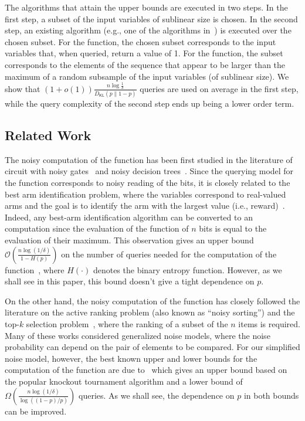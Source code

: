 \documentclass[journal, onecolumn]{IEEEtran}
\theoremstyle{plain}
\theoremstyle{definition}
\theoremstyle{remark}
\def\co{{\mathcal O}}
\begin{document}
The algorithms that attain the upper bounds are executed in two steps. In the first step, a subset of the input variables of sublinear size is chosen. In the second step, an existing algorithm (e.g., one of the algorithms in~\citep{feige1994computing}) is executed over the chosen subset. For the \orn function, the chosen subset corresponds to the input variables that, when queried, return a value of 1. For the \maxn function, the subset corresponds to the elements of the sequence that appear to be larger than the maximum of a random subsample of the input variables (of sublinear size). We show that $(1+o(1))\frac{n\log \frac{1}{\delta}}{D_{\mathsf{KL}}(p \| 1-p)}$ queries are used on average in the first step, while the query complexity of the second step ends up being a lower order term.




\subsection{Related Work}
The noisy computation of the \orn function has been first studied in the literature of circuit with noisy gates~\citep{dobrushin1977lower, dobrushin1977upper, von1956probabilistic, pippenger1991lower, gacs1994lower} and noisy decision trees~\citep{feige1994computing, evans1998average, reischuk1991reliable}. Since the querying model for the \orn function corresponds to noisy reading of the bits, it is closely related to the best arm identification problem, where the variables correspond to real-valued arms and the goal is to identify the arm with the largest value (i.e., reward)~\citep{bubeck2009pure, audibert2010best, garivier2016optimal, jamieson2014best, gabillon2012best, kaufmann2016complexity}. Indeed, any best-arm identification algorithm can be converted to an \orn computation since the evaluation of the \orn function of $n$ bits is equal to the evaluation of their maximum. This observation gives an upper bound $\co\left(\frac{n\log(1/\delta)}{1-H(p)}\right)$ on the number of queries needed for the computation of the \orn function~\citep{audibert2010best}, where $H(\cdot)$ denotes the binary entropy function. However, as we shall see in this paper, this bound doesn't give a tight dependence on $p$.

On the other hand, the noisy computation of the \maxn function has closely followed the literature on the active ranking problem (also known as ``noisy sorting'') and the top-$k$ selection problem~\citep{Mohajer2017,Shah2018,Agarwal2017,Falahatgar2017,Heckel2019,wang2022noisy, Wang2023,Gu-Xu2023}, where the ranking of a subset of the $n$ items is required. Many of these works considered generalized noise models, where the noise probability can depend on the pair of elements to be compared. For our simplified noise model, however, the best known upper and lower bounds for the computation of the \maxn function are due to~\citep{feige1994computing} which gives an upper bound based on the popular knockout tournament algorithm and a lower bound of $\Omega\left(\frac{n\log(1/\delta)}{\log((1-p)/p)}\right)$ queries. As we shall see, the dependence on $p$ in both bounds can be improved.
\end{document}
